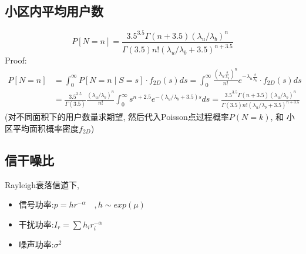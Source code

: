 \documentclass{article}
\begin{document}
    \subsection{小区内平均用户数}
        $$P[N=n]=\frac{3.5^{3.5} \Gamma(n+3.5)\left(\lambda_{u} / \lambda_{b}\right)^{n}}{\Gamma(3.5) n !\left(\lambda_{u} / \lambda_{b}+3.5\right)^{n+3.5}}$$
        Proof:
        \begin{align*}
        P[N=n]  
            &=\int_{0}^{\infty} P[N=n \mid S=s] \cdot f_{2D}(s) d s =\int_{0}^{\infty} \frac{\left(\lambda_{u} \frac{s}{\lambda_{b}}\right)^{n}}{n !} e^{-\lambda_{u} \frac{s}{\lambda_{b}}} \cdot f_{2D}(s) d s \\
            &=\frac{3.5^{3.5}}{\Gamma(3.5)} \frac{\left(\lambda_{u} / \lambda_{b}\right)^{n}}{n !} \int_{0}^{\infty} s^{n+2.5} e^{-\left(\lambda_{u} / \lambda_{b}+3.5\right) s} d s =\frac{3.5^{3.5} \Gamma(n+3.5)\left(\lambda_{u} / \lambda_{b}\right)^{n}}{\Gamma(3.5) n !\left(\lambda_{u} / \lambda_{b}+3.5\right)^{n+3.5}}
        \end{align*}
        (对不同面积下的用户数量求期望, 然后代入Poisson点过程概率$P(N=k)$, 和 小区平均面积概率密度$f_{2D}$)

    \subsection{信干噪比}
        Rayleigh衰落信道下,
        \begin{itemize}
            \item 信号功率:\quad $p = h r^{-\alpha} \quad ,h\sim exp(\mu)$
            \item 干扰功率:\quad $I_r = \sum h_i r_i^{-\alpha} \quad$
            \item 噪声功率:\quad $\sigma^2$
        \end{itemize}
\end{document}
